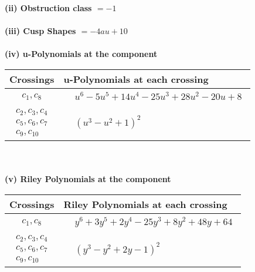 \documentclass[1p]{elsarticle_modified}
\theoremstyle{definition}
\begin{document}
\flushleft \textbf{(ii) Obstruction class $= -1$}\\~\\
\flushleft \textbf{(iii) Cusp Shapes $= -4 a u+10$}\\~\\
\newpage\renewcommand{\arraystretch}{1}
\flushleft \textbf{(iv) u-Polynomials at the component}\newline \\
\begin{tabular}{m{50pt}|m{274pt}}
Crossings & \hspace{64pt}u-Polynomials at each crossing \\
\hline $$\begin{aligned}c_{1},c_{8}\end{aligned}$$&$\begin{aligned}
&u^6-5 u^5+14 u^4-25 u^3+28 u^2-20 u+8
\end{aligned}$\\
\hline $$\begin{aligned}c_{2},c_{3},c_{4}\\c_{5},c_{6},c_{7}\\c_{9},c_{10}\end{aligned}$$&$\begin{aligned}
&(u^3- u^2+1)^2
\end{aligned}$\\
\hline
\end{tabular}\\~\\
\newpage\renewcommand{\arraystretch}{1}
\flushleft \textbf{(v) Riley Polynomials at the component}\newline \\
\begin{tabular}{m{50pt}|m{274pt}}
Crossings & \hspace{64pt}Riley Polynomials at each crossing \\
\hline $$\begin{aligned}c_{1},c_{8}\end{aligned}$$&$\begin{aligned}
&y^6+3 y^5+2 y^4-25 y^3+8 y^2+48 y+64
\end{aligned}$\\
\hline $$\begin{aligned}c_{2},c_{3},c_{4}\\c_{5},c_{6},c_{7}\\c_{9},c_{10}\end{aligned}$$&$\begin{aligned}
&(y^3- y^2+2 y-1)^2
\end{aligned}$\\
\hline
\end{tabular}\\~\\
\end{document}
